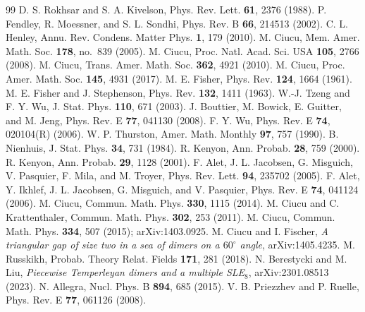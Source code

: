 \documentclass[aps,pre,twocolumn,superscriptaddress,nofootinbib,floatfix]{revtex4-2}
\begin{document}
\clearpage
\begin{thebibliography}{99}
 D. S. Rokhsar and S. A. Kivelson, Phys. Rev. Lett. \textbf{61}, 2376 (1988).
 P. Fendley, R. Moessner, and S. L. Sondhi, Phys. Rev. B \textbf{66}, 214513 (2002).
 C. L. Henley, Annu. Rev. Condens. Matter Phys. \textbf{1}, 179 (2010).
 M. Ciucu, Mem. Amer. Math. Soc. \textbf{178}, no.\ 839 (2005).
 M. Ciucu, Proc. Natl. Acad. Sci. USA \textbf{105}, 2766 (2008).
 M. Ciucu, Trans. Amer. Math. Soc. \textbf{362}, 4921 (2010).
 M. Ciucu, Proc. Amer. Math. Soc. \textbf{145}, 4931 (2017).
 M. E. Fisher, Phys. Rev. \textbf{124}, 1664 (1961).
 M. E. Fisher and J. Stephenson, Phys. Rev. \textbf{132}, 1411 (1963).
 W.-J. Tzeng and F. Y. Wu, J. Stat. Phys. \textbf{110}, 671 (2003).
 J. Bouttier, M. Bowick, E. Guitter, and M. Jeng, Phys. Rev. E \textbf{77}, 041130 (2008).
 F. Y. Wu, Phys. Rev. E \textbf{74}, 020104(R) (2006).
 W. P. Thurston, Amer. Math. Monthly \textbf{97}, 757 (1990).
 B. Nienhuis, J. Stat. Phys. \textbf{34}, 731 (1984).
 R. Kenyon, Ann. Probab. \textbf{28}, 759 (2000).
 R. Kenyon, Ann. Probab. \textbf{29}, 1128 (2001).
 F. Alet, J. L. Jacobsen, G. Misguich, V. Pasquier, F. Mila, and M. Troyer, Phys. Rev. Lett. \textbf{94}, 235702 (2005).
 F. Alet, Y. Ikhlef, J. L. Jacobsen, G. Misguich, and V. Pasquier, Phys. Rev. E \textbf{74}, 041124 (2006).
 M. Ciucu, Commun. Math. Phys. \textbf{330}, 1115 (2014).
 M. Ciucu and C. Krattenthaler, Commun. Math. Phys. \textbf{302}, 253 (2011).
 M. Ciucu, Commun. Math. Phys. \textbf{334}, 507 (2015); arXiv:1403.0925.
 M. Ciucu and I. Fischer, \emph{A triangular gap of size two in a sea of dimers on a $60^\circ$ angle}, arXiv:1405.4235.
 M. Russkikh, Probab. Theory Relat. Fields \textbf{171}, 281 (2018).
 N. Berestycki and M. Liu, \emph{Piecewise Temperleyan dimers and a multiple SLE$_8$}, arXiv:2301.08513 (2023).
 N. Allegra, Nucl. Phys. B \textbf{894}, 685 (2015).
 V. B. Priezzhev and P. Ruelle, Phys. Rev. E \textbf{77}, 061126 (2008).

\end{thebibliography}
\end{document}
